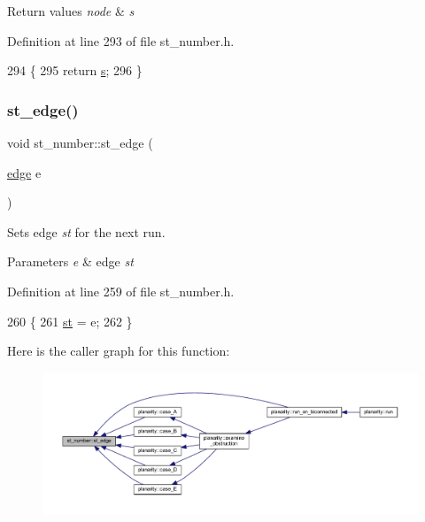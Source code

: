 \begin{DoxyRetVals}{Return values}
{\em node} & {\itshape s} \\
\hline
\end{DoxyRetVals}


Definition at line 293 of file st\+\_\+number.\+h.


\begin{DoxyCode}
294     \{
295     \textcolor{keywordflow}{return} \mbox{\hyperlink{classst__number_a1ada73c04f88b70b2392aa9ab0d1a6b0}{s}};
296     \}
\end{DoxyCode}
\mbox{\label{classst__number_a1564af6f603160105643f22bf2f6955b}} 
\subsubsection{\texorpdfstring{st\+\_\+edge()}{st\_edge()}\hspace{0.1cm}{\footnotesize\ttfamily [1/2]}}
{\footnotesize\ttfamily void st\+\_\+number\+::st\+\_\+edge (\begin{DoxyParamCaption}\item[{\mbox{\hyperlink{classedge}{edge}}}]{e }\end{DoxyParamCaption})\hspace{0.3cm}{\ttfamily [inline]}}



Sets edge {\itshape st} for the next run. 


\begin{DoxyParams}{Parameters}
{\em e} & edge {\itshape st} \\
\hline
\end{DoxyParams}


Definition at line 259 of file st\+\_\+number.\+h.


\begin{DoxyCode}
260     \{
261     \mbox{\hyperlink{classst__number_a58fe3a128f0d06ce17742b62d8eff1a8}{st}} = e;
262     \}
\end{DoxyCode}
Here is the caller graph for this function\+:\nopagebreak
\begin{figure}[H]
\begin{center}
\leavevmode
\includegraphics[width=350pt]{classst__number_a1564af6f603160105643f22bf2f6955b_icgraph}
\end{center}
\end{figure}
\mbox{\label{classst__number_a8938bab7883ff4194d1a7b4c6d8fb471}} 
